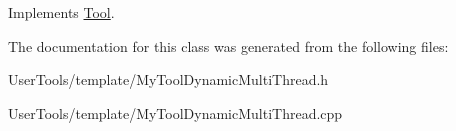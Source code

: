 Implements \hyperlink{classTool_a4b04a99172dfe09dc97927d1feaff0ce}{Tool}.



The documentation for this class was generated from the following files\-:\begin{DoxyCompactItemize}
\item 
User\-Tools/template/My\-Tool\-Dynamic\-Multi\-Thread.\-h\item 
User\-Tools/template/My\-Tool\-Dynamic\-Multi\-Thread.\-cpp\end{DoxyCompactItemize}
